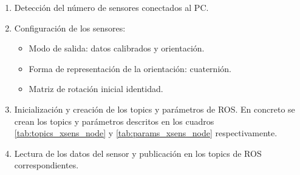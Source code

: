 \documentclass[12pt, a4paper]{report}
\begin{document}
\begin{enumerate}

	\item Detección del número de sensores conectados al PC.
	
	\item Configuración de los sensores:
	
	\begin{itemize}
	
		\item Modo de salida: datos calibrados y orientación.
		\item Forma de representación de la orientación: cuaternión.
		\item Matriz de rotación inicial identidad.	
	
	\end{itemize}
	
	\item Inicialización y creación de los topics y parámetros de ROS. En concreto se crean los topics y parámetros descritos en los cuadros \ref{tab:topics_xsens_node} y \ref{tab:params_xsens_node} respectivamente.
	
	\item Lectura de los datos del sensor y publicación en los topics de ROS correspondientes.
		
	
\end{enumerate}
\end{document}
